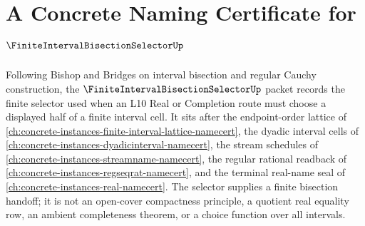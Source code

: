 \chapter{A Concrete Naming Certificate for $\FiniteIntervalBisectionSelectorUp$}
\label{ch:concrete-instances-finite-interval-bisection-selector-namecert}

Following Bishop and Bridges on interval bisection and regular Cauchy construction, the $\FiniteIntervalBisectionSelectorUp$ packet records the finite selector used when an L10 Real or Completion route must choose a displayed half of a finite interval cell. It sits after the endpoint-order lattice of \autoref{ch:concrete-instances-finite-interval-lattice-namecert}, the dyadic interval cells of \autoref{ch:concrete-instances-dyadicinterval-namecert}, the stream schedules of \autoref{ch:concrete-instances-streamname-namecert}, the regular rational readback of \autoref{ch:concrete-instances-regseqrat-namecert}, and the terminal real-name seal of \autoref{ch:concrete-instances-real-namecert}. The selector supplies a finite bisection handoff; it is not an open-cover compactness principle, a quotient real equality row, an ambient completeness theorem, or a choice function over all intervals.


